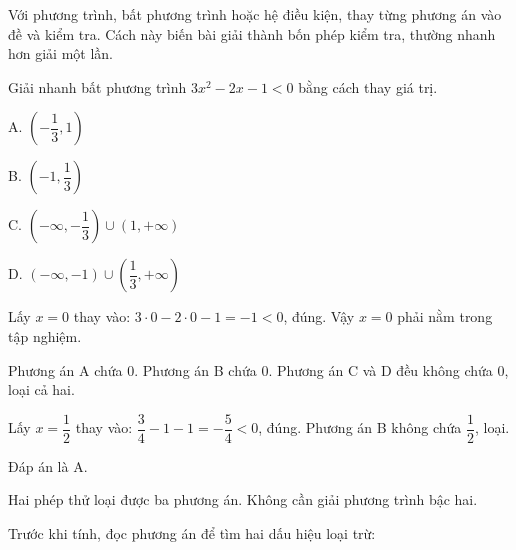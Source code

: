 \documentclass[11pt, a4paper]{article}
\begin{document}
\begin{dinhly}
Với phương trình, bất phương trình hoặc hệ điều kiện, thay từng phương án vào đề và kiểm tra. Cách này biến bài giải thành bốn phép kiểm tra, thường nhanh hơn giải một lần.
\end{dinhly}
\begin{vidu}[{8}]
Giải nhanh bất phương trình $3x^2 - 2x - 1 < 0$ bằng cách thay giá trị.

A. $\left(-\dfrac{1}{3}, 1\right)$

B. $\left(-1, \dfrac{1}{3}\right)$

C. $(-\infty, -\dfrac{1}{3}) \cup (1, +\infty)$

D. $(-\infty, -1) \cup \left(\dfrac{1}{3}, +\infty\right)$

Lấy $x = 0$ thay vào: $3 \cdot 0 - 2 \cdot 0 - 1 = -1 < 0$, đúng. Vậy $x = 0$ phải nằm trong tập nghiệm.

Phương án A chứa $0$. Phương án B chứa $0$. Phương án C và D đều không chứa $0$, loại cả hai.

Lấy $x = \dfrac{1}{2}$ thay vào: $\dfrac{3}{4} - 1 - 1 = -\dfrac{5}{4} < 0$, đúng. Phương án B không chứa $\dfrac{1}{2}$, loại.

Đáp án là A.

Hai phép thử loại được ba phương án. Không cần giải phương trình bậc hai.

\begin{dinhly}
Trước khi tính, đọc phương án để tìm hai dấu hiệu loại trừ:

\end{dinhly}
\end{vidu}
\end{document}
